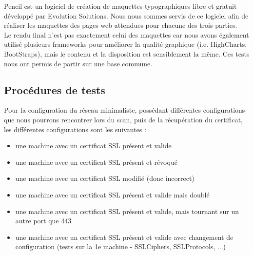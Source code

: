 Pencil est un logiciel de création de maquettes typographiques libre et gratuit développé par Evolution Solutions.
Nous nous sommes servis de ce logiciel afin de réaliser les maquettes des pages web attendues pour chacune des trois parties.\\
Le rendu final n'est pas exactement celui des maquettes car nous avons également utilisé plusieurs frameworks pour améliorer la qualité graphique (i.e. HighCharts, BootStraps), mais le contenu et la disposition est sensiblement la même.
Ces tests nous ont permis de partir sur une base commune.

\subsection{Procédures de tests}

Pour la configuration du réseau minimaliste, possédant différentes configurations que nous pourrons rencontrer lors du scan, puis de la récupération du certificat, les différentes configurations sont les suivantes :
\begin{itemize}
\item une machine avec un certificat SSL présent et valide
\item une machine avec un certificat SSL présent et révoqué
\item une machine avec un certificat SSL modifié (donc incorrect)
\item une machine avec un certificat SSL présent et valide mais doublé
\item une machine avec un certificat SSL présent et valide, mais tournant sur un autre port que 443
\item une machine avec un certificat SSL présent et valide avec changement de configuration (tests sur la 1e machine - SSLCiphers, SSLProtocols, ...)
\end{itemize}

